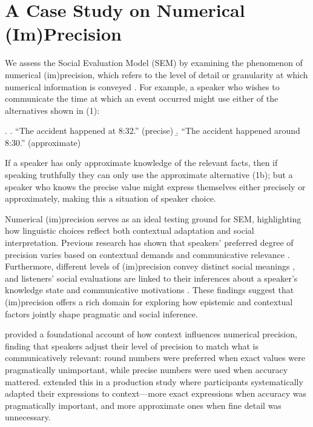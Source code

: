 \documentclass[12pt,a4paper]{article}
\begin{document}
\section{A Case Study on Numerical (Im)Precision}
\label{sec:imprecision}

We assess the Social Evaluation Model (SEM) by examining the phenomenon of
numerical (im)precision, which refers to the level of detail or granularity at
which numerical information is conveyed \citep{krifka2009}. For example, a
speaker who wishes to communicate the time at which an event occurred might use
either of the alternatives shown in (1):

\ex. \a. ``The accident happened at 8:32.'' \hfill(precise)
     \b. ``The accident happened around 8:30.'' \hfill(approximate)

\noindent If a speaker has only approximate knowledge of the relevant facts,
then if speaking truthfully they can only use the approximate alternative (1b);
but a speaker who knows the precise value might express themselves either
precisely or approximately, making this a situation of speaker choice.

Numerical (im)precision serves as an ideal testing ground for SEM, highlighting
how linguistic choices reflect both contextual adaptation and social
interpretation. Previous research has shown that speakers' preferred degree of
precision varies based on contextual demands and communicative relevance
\citep{vanderhenst2002,muehlenberndsolt2022}. Furthermore, different levels of
(im)precision convey distinct social meanings \citep{beltrama2018,beltramaetal2022},
and listeners' social evaluations are linked to their inferences about a
speaker's knowledge state and communicative motivations \citep{soltEtAl2025}.
These findings suggest that (im)precision offers a rich domain for exploring how
epistemic and contextual factors jointly shape pragmatic and social inference.

\citet{vanderhenst2002} provided a foundational account of how context
influences numerical precision, finding that speakers adjust their level of
precision to match what is communicatively relevant: round numbers were preferred
when exact values were pragmatically unimportant, while precise numbers were used
when accuracy mattered. \citet{muehlenberndsolt2022} extended this in a
production study where participants systematically adapted their expressions to
context---more exact expressions when accuracy was pragmatically important, and
more approximate ones when fine detail was unnecessary.
\end{document}

